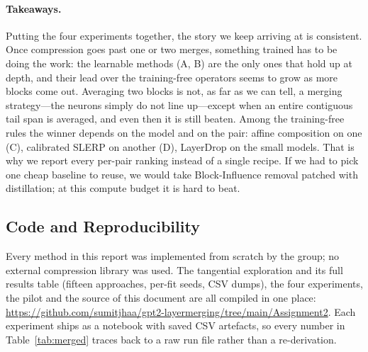 \documentclass[10pt,a4paper]{article}
\begin{document}
\paragraph{Takeaways.} Putting the four experiments together, the story we keep
arriving at is consistent. Once compression goes past one or two merges,
something trained has to be doing the work: the learnable methods (A, B) are
the only ones that hold up at depth, and their lead over the training-free
operators seems to grow as more blocks come out. Averaging two blocks is not,
as far as we can tell, a merging strategy---the neurons simply do not line
up---except when an entire contiguous tail span is averaged, and even then it
is still beaten. Among the training-free rules the winner depends on the model
and on the pair: affine composition on one (C), calibrated SLERP on another
(D), LayerDrop on the small models. That is why we report every per-pair
ranking instead of a single recipe. If we had to pick one cheap baseline to
reuse, we would take Block-Influence removal patched with distillation; at
this compute budget it is hard to beat.

\subsection{Code and Reproducibility}
\label{sec:code}

Every method in this report was implemented from scratch by the group; no
external compression library was used. The tangential exploration and its full
results table (fifteen approaches, per-fit seeds, CSV dumps), the four
experiments, the pilot and the source of this document are all compiled in one
place:
\url{https://github.com/sumitjhaa/gpt2-layermerging/tree/main/Assignment2}.
Each experiment ships as a notebook with saved CSV artefacts, so every number
in Table~\ref{tab:merged} traces back to a raw run file rather than a
re-derivation.
\end{document}

